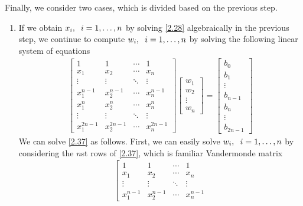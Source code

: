 \documentclass[a4paper]{article}
\numberwithin{equation}{section}
\begin{document}
Finally, we consider two cases, which is divided based on the previous step.
\begin{enumerate}
\item If we obtain $x_i,\hspace{0.2cm}i=1,\ldots,n$ by solving \eqref{2.28} algebraically in the previous step, we continue to compute $w_i,\hspace{0.2cm}i=1,\ldots,n$ by solving the following linear system of equations
\begin{align}
\label{2.37}
\left[ {\begin{array}{*{20}{c}}
1&1& \cdots &1\\
{{x_1}}&{{x_2}}& \cdots &{{x_n}}\\
 \vdots & \vdots & \ddots & \vdots \\
{x_1^{n - 1}}&{x_2^{n - 1}}& \cdots &{x_n^{n - 1}}\\
{x_1^n}&{x_2^n}& \cdots &{x_n^n}\\
 \vdots & \vdots & \ddots & \vdots \\
{x_1^{2n - 1}}&{x_2^{2n - 1}}& \cdots &{x_n^{2n - 1}}
\end{array}} \right]\left[ {\begin{array}{*{20}{c}}
{{w_1}}\\
{{w_2}}\\
 \vdots \\
{{w_n}}
\end{array}} \right] = \left[ {\begin{array}{*{20}{c}}
{{b_0}}\\
{{b_1}}\\
 \vdots \\
{{b_{n - 1}}}\\
{{b_n}}\\
 \vdots \\
{{b_{2n - 1}}}
\end{array}} \right]
\end{align}
We can solve \eqref{2.37} as follows. First, we can easily solve $w_i,\hspace{0.2cm}i=1,\ldots,n$ by considering the $n$st rows of \eqref{2.37}, which is familiar Vandermonde matrix
\begin{align}
\label{2.38}
\left[ {\begin{array}{*{20}{c}}
1&1& \cdots &1\\
{{x_1}}&{{x_2}}& \cdots &{{x_n}}\\
 \vdots & \vdots & \ddots & \vdots \\
{x_1^{n - 1}}&{x_2^{n - 1}}& \cdots &{x_n^{n - 1}}

\end{array}}
\end{align}
\end{enumerate}
\end{document}
